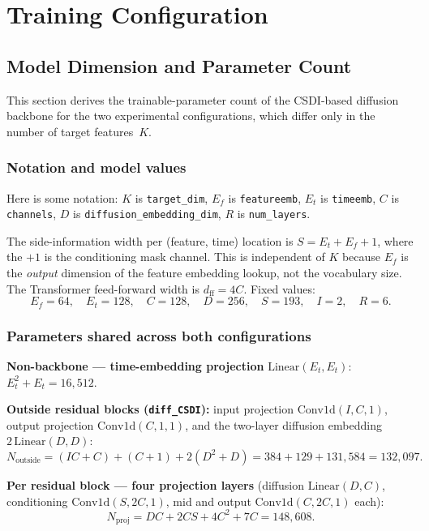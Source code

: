 \chapter{Training Configuration}
\label{app:training_config}

\section{Model Dimension and Parameter Count}
\label{app:model-parameter-count}

This section derives the trainable-parameter count of the CSDI-based diffusion
backbone for the two experimental configurations, which differ only in the
number of target features~$K$.

\subsection{Notation and model values}
Here is some notation: \(K\) is \texttt{target\_dim}, 
\(E_f\) is \texttt{featureemb},
\(E_t\) is \texttt{timeemb}, \(C\) is \texttt{channels}, \(D\) is \texttt{diffusion\_embedding\_dim}, \(R\) is \texttt{num\_layers}.

The side-information width per (feature, time) location is
$S = E_t + E_f + 1$,
where the $+1$ is the conditioning mask channel.
This is independent of $K$ because $E_f$ is the \emph{output} dimension of the
feature embedding lookup, not the vocabulary size.
The Transformer feed-forward width is $d_{\mathrm{ff}} = 4C$.
Fixed values:
\[
E_f = 64,\quad
E_t = 128,\quad
C = 128,\quad
D = 256,\quad
S = 193,\quad
I = 2,\quad
R = 6.
\]

\subsection{Parameters shared across both configurations}

\textbf{Non-backbone — time-embedding projection}
$\mathrm{Linear}(E_t, E_t)$:\(
E_t^2 + E_t = 16{,}512.\)

\textbf{Outside residual blocks (\texttt{diff\_CSDI}):}
input projection $\mathrm{Conv1d}(I,C,1)$, output projection
$\mathrm{Conv1d}(C,1,1)$, and the two-layer diffusion embedding
$2\,\mathrm{Linear}(D,D)$:
\[
N_{\mathrm{outside}}
= (IC+C) + (C+1) + 2(D^2+D)
= 384 + 129 + 131{,}584
= 132{,}097.
\]

\textbf{Per residual block — four projection layers}
(diffusion $\mathrm{Linear}(D,C)$, conditioning $\mathrm{Conv1d}(S,2C,1)$,
mid and output $\mathrm{Conv1d}(C,2C,1)$ each):
\[
N_{\mathrm{proj}}
= DC + 2CS + 4C^2 + 7C
= 148{,}608.
\]

